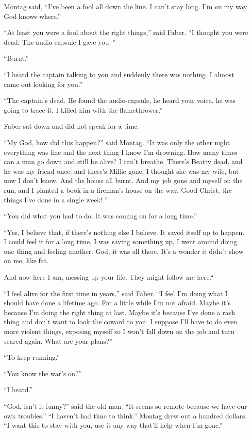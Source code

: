 \documentclass[11pt,openany]{book}
\begin{document}
Montag said, ``I've been a fool all down the line. I can't stay long. I'm on my way God knows where.''

``At least you were a fool about the right things,'' said Faber. ``I thought you were dead. The audio-capsule I gave you--''

``Burnt.''

``I heard the captain talking to you and suddenly there was nothing. I almost came out looking for you.''

``The captain's dead. He found the audio-capsule, he heard your voice, he was going to trace it. I killed him with the flamethrower.''

Faber sat down and did not speak for a time.

``My God, how did this happen?'' said Montag. ``It was only the other night everything was fine and the next thing I know I'm drowning. How many times can a man go down and still be alive? I can't breathe. There's Beatty dead, and he was my friend once, and there's Millie gone, I thought she was my wife, but now I don't know. And the house all burnt. And my job gone and myself on the run, and I planted a book in a fireman's house on the way. Good Christ, the things I've done in a single week! ''

``You did what you had to do. It was coming on for a long time.''

``Yes, I believe that, if there's nothing else I believe. It saved itself up to happen. I could feel it for a long time, I was saving something up, I went around doing one thing and feeling another. God, it was all there. It's a wonder it didn't show on me, like fat.

And now here I am, messing up your life. They might follow me here.``

``I feel alive for the first time in years,'' said Faber. ``I feel I'm doing what I should have done a lifetime ago. For a little while I'm not afraid. Maybe it's because I'm doing the right thing at last. Maybe it's because I've done a rash thing and don't want to look the coward to you. I suppose I'll have to do even more violent things, exposing myself so I won't fall down on the job and turn scared again. What are your plans?''

``To keep running.''

``You know the war's on?''

``I heard.''

``God, isn't it funny?'' said the old man. ``It seems so remote because we have our own troubles.'' ``I haven't had time to think.'' Montag drew out a hundred dollars. ``I want this to stay with you, use it any way that'll help when I'm gone.''
\end{document}
